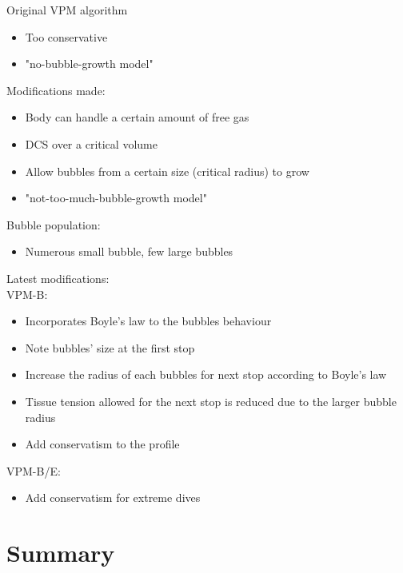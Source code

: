 \documentclass[aspectratio=1610,english,14pt]{beamer}
\begin{document}
\begin{frame}{\insertsubsection}
	Original VPM algorithm\\
	\begin{itemize}
		\item Too conservative
		\item "no-bubble-growth model"
	\end{itemize}
	\pause \vfill
	Modifications made:
	\begin{itemize}
		\item Body can handle a certain amount of free gas
		\item DCS over a critical volume
		\item Allow bubbles from a certain size (critical radius) to grow
		\item "not-too-much-bubble-growth model"
	\end{itemize}
	\pause \vfill
	Bubble population:
		\begin{itemize}
			\item Numerous small bubble, few large bubbles
		\end{itemize}
\end{frame}

\begin{frame}{\insertsubsection}  
	Latest modifications:\\
	VPM-B:
	\begin{itemize}
		\item Incorporates Boyle's law to the bubbles behaviour
		\item Note bubbles' size at the first stop
		\item Increase the radius of each bubbles for next stop according to Boyle's law
		\item Tissue tension allowed for the next stop is reduced due to the larger bubble radius
		\item Add conservatism to the profile
	\end{itemize}
	VPM-B/E:
	\begin{itemize}
		\item Add conservatism for extreme dives
	\end{itemize}
\end{frame}

\section{Summary}
\end{document}
